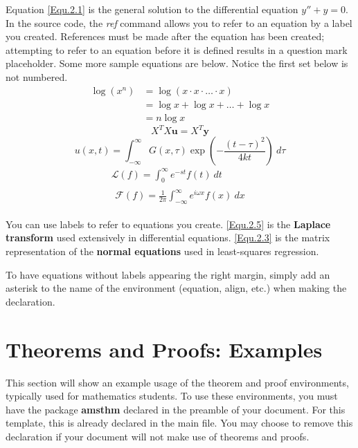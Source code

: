 Equation \ref{Equ.2.1} is the general solution to the differential equation $y''+y=0$. In the source code, the \textit{ref} command allows you to refer to an equation by a label you created. References must be made after the equation has been created; attempting to refer to an equation before it is defined results in a question mark placeholder. Some more sample equations are below. Notice the first set below is not numbered.
\begin{align*}
\log (x^n) &= \log (x \cdot x \cdot \ldots \cdot x) \\
&= \log x + \log x + \ldots + \log x \\
&= n \log x
\end{align*}
\begin{equation} \label{Equ.2.3}
X^T X \mathbf{u} = X^T \mathbf{y}
\end{equation}
\begin{equation}\label{Equ.2.4}
u(x, t) = \int_{-\infty}^{\infty} G(x, \tau) \exp\left(-\frac{(t-\tau)^2}{4kt}\right) \ d\tau
\end{equation}
\begin{gather}
\mathcal{L}(f) = \int_{0}^{\infty} e^{-st} f(t) \ dt \\
\begin{split} \label{Equ.2.5}
\mathcal{F}(f) = \frac{1}{2\pi}\int_{-\infty}^{\infty} e^{i \omega x} f(x) \ dx
\end{split}
\end{gather}

You can use labels to refer to equations you create. \ref{Equ.2.5} is the \textbf{Laplace transform} used extensively in differential equations. \ref{Equ.2.3} is the matrix representation of the \textbf{normal equations} used in least-squares regression.

To have equations without labels appearing the right margin, simply add an asterisk to the name of the environment (equation, align, etc.) when making the declaration.


\section{Theorems and Proofs: Examples}

This section will show an example usage of the theorem and proof environments, typically used for mathematics students. To use these environments, you must have the package \textbf{amsthm} declared in the preamble of your document. For this template, this is already declared in the main file. You may choose to remove this declaration if your document will not make use of theorems and proofs.


